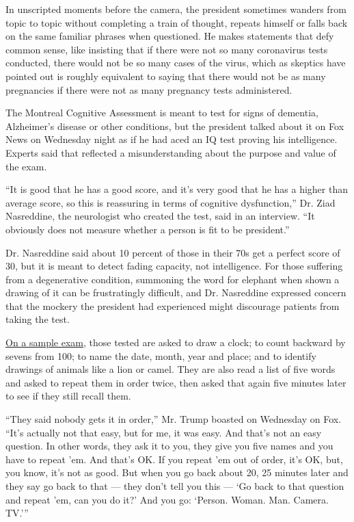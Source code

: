 In unscripted moments before the camera, the president sometimes wanders
from topic to topic without completing a train of thought, repeats
himself or falls back on the same familiar phrases when questioned. He
makes statements that defy common sense, like insisting that if there
were not so many coronavirus tests conducted, there would not be so many
cases of the virus, which as skeptics have pointed out is roughly
equivalent to saying that there would not be as many pregnancies if
there were not as many pregnancy tests administered.

The Montreal Cognitive Assessment is meant to test for signs of
dementia, Alzheimer's disease or other conditions, but the president
talked about it on Fox News on Wednesday night as if he had aced an IQ
test proving his intelligence. Experts said that reflected a
misunderstanding about the purpose and value of the exam.

``It is good that he has a good score, and it's very good that he has a
higher than average score, so this is reassuring in terms of cognitive
dysfunction,'' Dr. Ziad Nasreddine, the neurologist who created the
test, said in an interview. ``It obviously does not measure whether a
person is fit to be president.''

Dr. Nasreddine said about 10 percent of those in their 70s get a perfect
score of 30, but it is meant to detect fading capacity, not
intelligence. For those suffering from a degenerative condition,
summoning the word for elephant when shown a drawing of it can be
frustratingly difficult, and Dr. Nasreddine expressed concern that the
mockery the president had experienced might discourage patients from
taking the test.

\href{https://www.parkinsons.va.gov/resources/MOCA-Test-English.pdf}{On
a sample exam,} those tested are asked to draw a clock; to count
backward by sevens from 100; to name the date, month, year and place;
and to identify drawings of animals like a lion or camel. They are also
read a list of five words and asked to repeat them in order twice, then
asked that again five minutes later to see if they still recall them.

``They said nobody gets it in order,'' Mr. Trump boasted on Wednesday on
Fox. ``It's actually not that easy, but for me, it was easy. And that's
not an easy question. In other words, they ask it to you, they give you
five names and you have to repeat 'em. And that's OK. If you repeat 'em
out of order, it's OK, but, you know, it's not as good. But when you go
back about 20, 25 minutes later and they say go back to that --- they
don't tell you this --- `Go back to that question and repeat 'em, can
you do it?' And you go: `Person. Woman. Man. Camera. TV.'''

